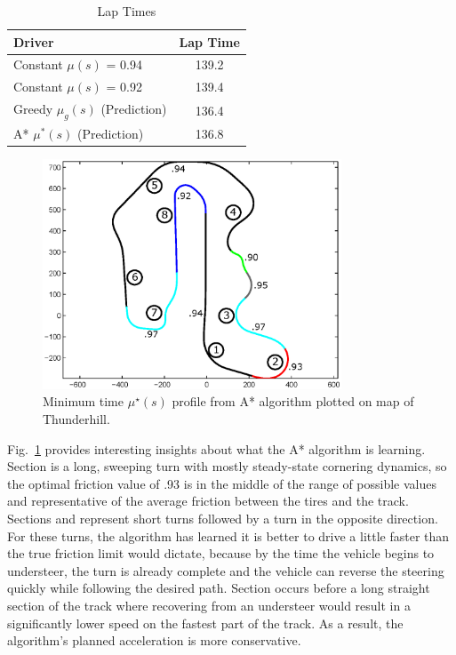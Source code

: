 \documentclass[9pt,shortpaper,twoside,web]{ieeecolor}
\newcommand*\circled[1]{\tikz[baseline=(char.base)]{
            \node[shape=circle,draw,inner sep=2pt] (char) {#1};}}
\begin{document}
 \begin{table}[h]
\begin{center}
\caption{Lap Times}\label{tb:predresults}
\begin{tabular}{l|c}
Driver          & Lap Time \\\hline
Constant $\mu(s)$ = 0.94 & 139.2 \\
Constant $\mu(s)$ = 0.92 & 139.4 \\\hline
Greedy $\mu_g(s)$ (Prediction) & 136.4 \\
A*     $\mu^*(s)$ (Prediction) & 136.8 \\\hline
\end{tabular}
\end{center}
\end{table}
 
\begin{figure}[tb]
\centering
\includegraphics[width=3.5in]{figures/mumap.eps}
\caption{Minimum time $\mu^\star(s)$ profile from A* algorithm plotted on map of Thunderhill.}
\label{fig:mumap}
\end{figure}  

Fig.~\ref{fig:mumap} provides interesting insights about what the A* algorithm is learning. Section \circled{2} is a 
long, sweeping turn with mostly steady-state cornering dynamics, so the optimal friction value of .93 is in the middle
of the range of possible values and representative of the average friction between the tires and the track. Sections \circled{3}
and \circled{7} represent short turns followed by a turn in the opposite direction. For these turns, the algorithm has learned it is better to drive a little
 faster than the true friction limit would dictate, because by the time the vehicle begins to understeer, the turn is already complete and
 the vehicle can reverse the steering quickly while following the desired path. Section \circled{8} occurs before a long straight section of the track where recovering
from an understeer would result in a significantly lower speed on the fastest part of the track. As a result, the algorithm's planned acceleration is more conservative. 
\end{document}
